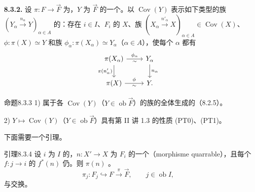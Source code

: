 \textbf{8.3.2.} 设 $\pi:F\to\overrightarrow F$ 为，$Y$ 为 $\overrightarrow F$ 的一个。以 $\operatorname{Cov}(Y)$ 表示如下类型的族 $(Y_\alpha\xrightarrow{n_\alpha}Y)_{\alpha\in A}$ 的：存在 $i\in I$、$F_i$ 的 $X$、族 $(X_\alpha\xrightarrow{n'_\alpha}X)_{\alpha\in A}\in\operatorname{Cov}(X)$、 $\phi:\pi(X)\simeq Y$ 和族 $\phi_\alpha:\pi(X_\alpha)\simeq Y_\alpha$（$\alpha\in A$），使每个 $\alpha$ 都有
\[\begin{tikzcd}
\pi(X_\alpha)\arrow[r,"\phi_\alpha","\sim"']\arrow[d,"\pi(n'_\alpha)"']&Y_\alpha\arrow[d,"n_\alpha"]\\
\pi(X)\arrow[r,"\phi","\sim"']&Y.
\end{tikzcd}\]
\begin{SGAresult}{命题}{8.3.3}
1) 属于各 $\operatorname{Cov}(Y)$（$Y\in\operatorname{ob}\overrightarrow F$）的族的全体生成的（8.2.5）。

2) $Y\mapsto\operatorname{Cov}(Y)$（$Y\in\operatorname{ob}\overrightarrow F$）具有第 II 讲 1.3 的性质 (PT0)、(PT1)。
\end{SGAresult}
下面需要一个引理。
\begin{SGAresult}{引理}{8.3.4}
设 $i$ 为 $I$ 的，$n:X'\to X$ 为 $F_i$ 的一个（morphisme quarrable），且每个 $f:j\to i$ 的 $f^*(n)$ 仍。则 $\pi(n)$ 。
\[\pi_j:F_j\hookrightarrow F\xrightarrow\pi\overrightarrow F,\qquad j\in\operatorname{ob}I,\]
与交换。
\end{SGAresult}
